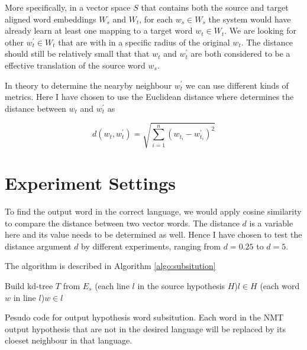 \documentclass[thesis,fonts=libertine]{cluu}
\begin{document}
More specifically, in a vector space $S$ that contains both the source and target aligned word embeddings $W_s$ and $W_t$, for each $w_s\in W_s$ the system would have already learn at least one mapping to a target word $w_t \in W_t$. We are looking for other $w_t^\prime \in W_t$ that are with in a specific radius of the original $w_t$. The distance should still be relatively small that that $w_t$ and $w_t^\prime$ are both considered to be a effective translation of the source word $w_s$.

In theory to determine the nearyby neighbour $w_t^\prime$ we can use different kinds of metrics. Here I have chosen to use the Euclidean distance where determines the distance between $w_t$ and $w_t^\prime$ as

\begin{equation}
  d(w_t, w_t^\prime)=\sqrt{\sum_{i=1}^n{(w_{t_i}-w^\prime_{t_i})}^2}
\end{equation}

\section{Experiment Settings}

To find the output word in the correct language, we would apply cosine similarity to compare the distance between two vector words. The distance $d$ is a variable here and its value needs to be determined as well. Hence I have chosen to test the distance argument $d$ by different experiments, ranging from $d=0.25$ to $d=5$.

The algorithm is described in Algorithm \ref{algo:subsitution}

\begin{algorithm}[H]
  \label{algo:subsitution}
  \SetAlgoLined

  Build kd-tree $T$ from $E_s$
  \For(each line $l$ in the source hypothesis $H$){$l \in H$}{
    \For(each word $w$ in line $l$){$w \in l$}{
    }
  }
  \caption{Pesudo code for output hypothesis word subsitution. Each word in the NMT output hypothesis that are not in the desired language will be replaced by its cloeset neighbour in that language.}
\end{algorithm}
\end{document}
